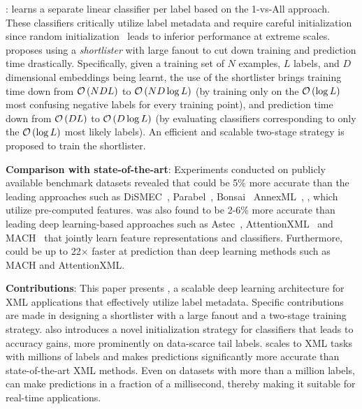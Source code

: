 \textbf{\alg}: \alg learns a separate linear classifier per label based on the 1-vs-All approach. These classifiers critically utilize label metadata and require careful initialization since random initialization~\citep{Glorot2010} leads to inferior performance at extreme scales. \alg proposes using a \emph{shortlister} with large fanout to cut down training and prediction time drastically. Specifically, given a training set of $N$ examples, $L$ labels, and $D$ dimensional embeddings being learnt, the use of the shortlister brings training time down from ${\mathcal O}\left({{NDL}}\right)$ to ${\mathcal O}\left({{ND\log L}}\right)$ (by training only on the ${\mathcal O}\left({{\log L}}\right)$ most confusing negative labels for every training point), and prediction time down from ${\mathcal O}\left({{DL}}\right)$ to ${\mathcal O}\left({{D\log L}}\right)$ (by evaluating classifiers corresponding to only the ${\mathcal O}\left({{\log L}}\right)$ most likely labels). An efficient and scalable two-stage strategy is proposed to train the shortlister.

\textbf{Comparison with state-of-the-art}: Experiments conducted on publicly available benchmark datasets revealed that \alg could be 5\% more accurate than the leading approaches such as DiSMEC~\citep{Babbar17}, Parabel~\citep{Prabhu18b}, Bonsai~\cite{Khandagale19} AnnexML~\citep{Tagami17}, \etc, which utilize pre-computed features. \alg was also found to be 2-6\% more accurate than leading deep learning-based approaches such as Astec~\citep{Dahiya21}, AttentionXML~\citep{You18} and MACH~\citep{Medini2019} that jointly learn feature representations and classifiers. Furthermore, \alg could be up to 22$\times$ faster at prediction than deep learning methods such as MACH and AttentionXML.

\textbf{Contributions}: This paper presents \alg, a scalable deep learning architecture for XML applications that effectively utilize label metadata. Specific contributions are made in designing a shortlister with a large fanout and a two-stage training strategy. \alg also introduces a novel initialization strategy for classifiers that leads to accuracy gains, more prominently on data-scarce tail labels. \alg scales to XML tasks with millions of labels and makes predictions significantly more accurate than state-of-the-art XML methods. Even on datasets with more than a million labels, \alg can make predictions in a fraction of a millisecond, thereby making it suitable for real-time applications.
